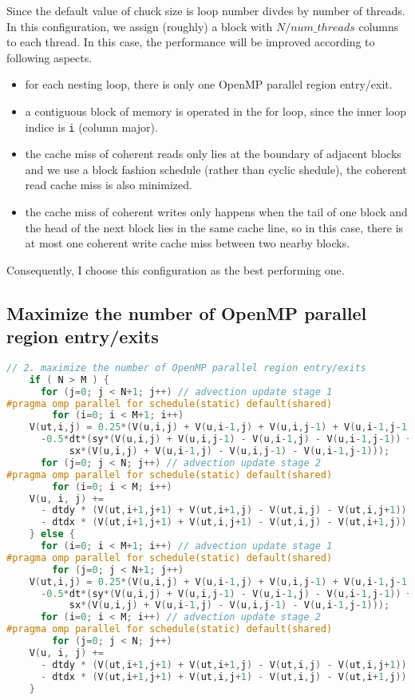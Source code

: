 Since the default value of chuck size is loop number divdes by number of threads.
In this configuration, we assign (roughly) a block with $N/num\_threads$ columns to each thread.
In this case, the performance will be improved according to following aspects.
\begin{itemize}
\item for each nesting loop, there is only one OpenMP parallel region entry/exit. 
\item a contiguous block of memory is operated in the for loop, since the inner loop indice is \lstinline{i} (column major).
\item the cache miss of coherent reads only lies at the boundary of adjacent blocks and we use a block fashion schedule (rather than cyclic shedule), the coherent read cache miss is also minimized.
\item the cache miss of coherent writes only happens when the tail of one block and the head of the next block lies in the same cache line, so in this case, there is at most one coherent write cache miss between two nearby blocks.
\end{itemize}
Consequently, I choose this configuration as the best performing one.

\subsection{Maximize the number of OpenMP parallel region entry/exits}

\begin{lstlisting}[language=c]
// 2. maximize the number of OpenMP parallel region entry/exits
    if ( N > M ) {
      for (j=0; j < N+1; j++) // advection update stage 1
#pragma omp parallel for schedule(static) default(shared)
        for (i=0; i < M+1; i++) 
  	V(ut,i,j) = 0.25*(V(u,i,j) + V(u,i-1,j) + V(u,i,j-1) + V(u,i-1,j-1))
  	  -0.5*dt*(sy*(V(u,i,j) + V(u,i,j-1) - V(u,i-1,j) - V(u,i-1,j-1)) +
  		   sx*(V(u,i,j) + V(u,i-1,j) - V(u,i,j-1) - V(u,i-1,j-1)));
      for (j=0; j < N; j++) // advection update stage 2
#pragma omp parallel for schedule(static) default(shared)
        for (i=0; i < M; i++) 
  	V(u, i, j) +=
  	  - dtdy * (V(ut,i+1,j+1) + V(ut,i+1,j) - V(ut,i,j) - V(ut,i,j+1))
  	  - dtdx * (V(ut,i+1,j+1) + V(ut,i,j+1) - V(ut,i,j) - V(ut,i+1,j));
    } else {
      for (i=0; i < M+1; i++) // advection update stage 1
#pragma omp parallel for schedule(static) default(shared)
        for (j=0; j < N+1; j++) 
  	V(ut,i,j) = 0.25*(V(u,i,j) + V(u,i-1,j) + V(u,i,j-1) + V(u,i-1,j-1))
  	  -0.5*dt*(sy*(V(u,i,j) + V(u,i,j-1) - V(u,i-1,j) - V(u,i-1,j-1)) +
  		   sx*(V(u,i,j) + V(u,i-1,j) - V(u,i,j-1) - V(u,i-1,j-1)));
      for (i=0; i < M; i++) // advection update stage 2
#pragma omp parallel for schedule(static) default(shared)
        for (j=0; j < N; j++) 
  	V(u, i, j) +=
  	  - dtdy * (V(ut,i+1,j+1) + V(ut,i+1,j) - V(ut,i,j) - V(ut,i,j+1))
  	  - dtdx * (V(ut,i+1,j+1) + V(ut,i,j+1) - V(ut,i,j) - V(ut,i+1,j));
    }
\end{lstlisting}

